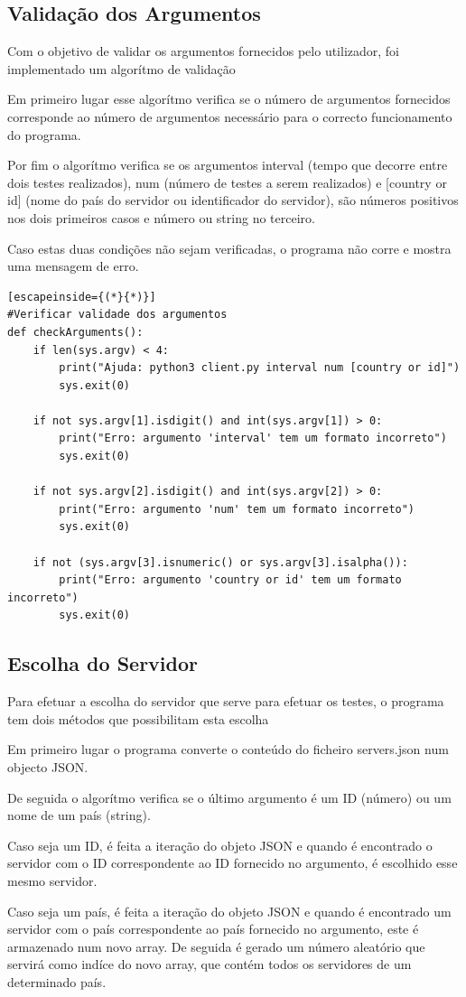 \documentclass{report}
\begin{document}
\subsection{Validação dos Argumentos}
\par Com o objetivo de validar os argumentos fornecidos pelo utilizador, foi implementado um algorítmo de validação
\par Em primeiro lugar esse algorítmo verifica se o número de argumentos fornecidos corresponde ao número de argumentos necessário para o correcto funcionamento do programa.
\par Por fim o algorítmo verifica se os argumentos interval (tempo que decorre entre dois testes realizados), num (número de testes a serem realizados) e [country or id] 
(nome do país do servidor ou identificador do servidor), são números positivos nos dois primeiros casos e número ou string no terceiro.
\par Caso estas duas condições não sejam verificadas, o programa não corre e mostra uma mensagem de erro.
\begin{lstlisting}[escapeinside={(*}{*)}]
#Verificar validade dos argumentos
def checkArguments():
    if len(sys.argv) < 4:
        print("Ajuda: python3 client.py interval num [country or id]")
        sys.exit(0)

    if not sys.argv[1].isdigit() and int(sys.argv[1]) > 0:
        print("Erro: argumento 'interval' tem um formato incorreto")
        sys.exit(0)

    if not sys.argv[2].isdigit() and int(sys.argv[2]) > 0:
        print("Erro: argumento 'num' tem um formato incorreto")
        sys.exit(0)

    if not (sys.argv[3].isnumeric() or sys.argv[3].isalpha()):
        print("Erro: argumento 'country or id' tem um formato incorreto")
        sys.exit(0)
\end{lstlisting}

\subsection{Escolha do Servidor}
\par Para efetuar a escolha do servidor que serve para efetuar os testes, o programa tem dois métodos que possibilitam esta escolha
\par Em primeiro lugar o programa converte o conteúdo do ficheiro servers.json num objecto JSON.
\par De seguida o algorítmo verifica se o último argumento é um ID (número) ou um nome de um país (string).
\par Caso seja um ID, é feita a iteração do objeto JSON e quando é encontrado o servidor com o ID correspondente ao ID fornecido no argumento, é escolhido esse mesmo servidor.
\par Caso seja um país, é feita a iteração do objeto JSON e quando é encontrado um servidor com o país correspondente ao país fornecido no argumento, este é armazenado num novo array.
De seguida é gerado um número aleatório que servirá como indíce do novo array, que contém todos os servidores de um determinado país.
\end{document}
